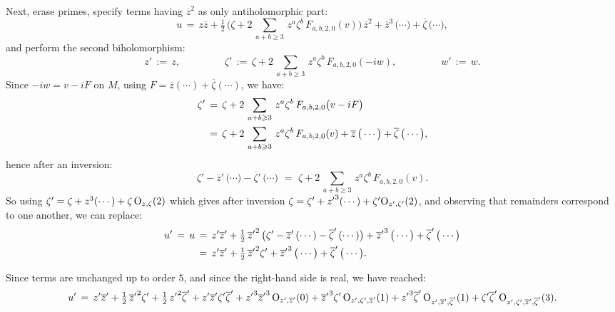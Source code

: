 \documentclass[12pt,twoside,leqno,openany]{amsart}
\begin{document}
Next, erase primes, specify terms having $\overline{z}^2$ as only
antiholomorphic part:
\[
u
\,=\,
z\overline{z}
+
\tfrac{1}{2}\,
\Big(
\zeta
+
2\,\sum_{a+b\geqslant 3}\,
z^a\zeta^b\,F_{a,b,2,0}(v)
\Big)\,
\overline{z}^2
+
\overline{z}^3\,\big(\cdots\big)
+
\overline{\zeta}\,\big(\cdots\big),
\]
and perform the second biholomorphism:
\[
z'
\,:=\,
z,
\ \ \ \ \ \ \ \ \ \ \ \ \ \ \ \ \ \ \ \
\zeta'
\,:=\,
\zeta
+
2\,\sum_{a+b\geqslant 3}\,
z^a\zeta^b\,F_{a,b,2,0}(-iw),
\ \ \ \ \ \ \ \ \ \ \ \ \ \ \ \ \ \ \ \
w'
\,:=\,
w.
\]
Since $-iw = v - iF$ on $M$, using $F = \overline{z} (\cdots) +
\overline{\zeta} (\cdots)$, we have:
\[
\aligned
\zeta'
&
\,=\,
\zeta
+
2\,\sum_{a+b\geqslant 3}\,
z^a\zeta^b\,
F_{a,b,2,0}\big(v-iF\big)
\\
&
\,=\,
\zeta
+
2\,\sum_{a+b\geqslant 3}\,
z^a\zeta^b\,
F_{a,b,2,0}(v)
+
\overline{z}\,\big(\cdots\big)
+
\overline{\zeta}\,\big(\cdots\big),
\endaligned
\]
hence after an inversion:
\[
\zeta'
-
\overline{z}'\,\big(\cdots\big)
-
\overline{\zeta}'\,\big(\cdots\big)
\,\,=\,\,
\zeta
+
2\,\sum_{a+b\geqslant 3}\,
z^a\zeta^b\,F_{a,b,2,0}(v).
\]
So using $\zeta' = \zeta + z^3 (\cdots) + \zeta\,
{\rm O}_{z,\zeta}(2)$
which gives after inversion $\zeta = \zeta' + {z'}^3 (\cdots)
+ \zeta' {\rm O}_{z', \zeta'}(2)$, 
and observing that remainders correspond
to one another, we can replace:
\[
\aligned
u'
\,=\,
u
&
\,=\,
z'\overline{z}'
+
\tfrac{1}{2}\,
{\overline{z}'}^2\,
\big(
\zeta'
-
\overline{z}'\,(\cdots)
-
\overline{\zeta}'\,(\cdots)
\big)
+
{\overline{z}'}^3\,
\big(\cdots\big)
+
\overline{\zeta}'\,\big(\cdots\big)
\\
&
\,=\,
z'\overline{z}'
+
\tfrac{1}{2}\,
{\overline{z}'}^2\zeta'
+
{\overline{z}'}^3\,\big(\cdots\big)
+
\overline{\zeta}'\,\big(\cdots\big).
\endaligned
\]

Since terms are unchanged up to order $5$, 
and since the right-hand side is real, 
we have reached:
\[
u'
\,=\,
z'\overline{z}'
+
\tfrac{1}{2}\,{\overline{z}'}^2\zeta'
+
\tfrac{1}{2}\,{z'}^2\overline{\zeta}'
+
z'\overline{z}'\zeta'\overline{\zeta}'
+
{z'}^3{\overline{z}'}^3\,{\rm O}_{z',\overline{z}'}(0)
+
{\overline{z}'}^3\zeta'\,{\rm O}_{z',\zeta',\overline{z}'}(1)
+
{z'}^3\overline{\zeta}'\,
{\rm O}_{z',\overline{z}',\overline{\zeta}'}(1)
+
\zeta'\overline{\zeta}'\,
{\rm O}_{z',\zeta',\overline{z}',\overline{\zeta}'}(3).
\] 
\end{document}
